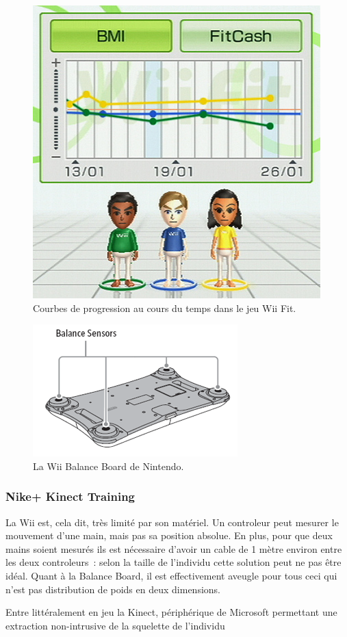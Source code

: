\begin{figure}[h!]
\centering
\includegraphics[width=0.5\linewidth]{images/wii_fit}
\caption{Courbes de progression au cours du temps dans le jeu Wii Fit.}
\label{fig:wii_fit}
\end{figure}

\begin{figure}[h!]
\centering
\includegraphics[width=0.5\linewidth]{images/balance_board}
\caption{La Wii Balance Board de Nintendo.}
\label{fig:balance_board}
\end{figure}


\subsubsection{Nike+ Kinect Training}

La Wii est, cela dit, très limité par son matériel. Un controleur peut mesurer
le mouvement d'une main, mais pas sa position absolue. En plus, pour que deux 
mains soient
mesurés ils est nécessaire d'avoir un cable de 1 mètre environ entre les deux
controleurs~: selon la taille de l'individu cette solution peut ne pas être
idéal. Quant à la Balance Board, il est effectivement aveugle pour tous ceci qui
n'est pas distribution de poids en deux dimensions.

Entre littéralement en jeu la Kinect, périphérique de Microsoft permettant une
extraction non-intrusive de la squelette de l'individu



